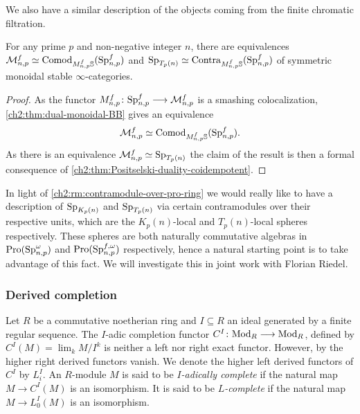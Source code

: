We also have a similar description of the objects coming from the finite chromatic filtration. 

\begin{proposition}
    For any prime $p$ and non-negative integer $n$, there are equivalences $\mathcal{M}_{n,p}^f \simeq \mathrm{Comod}_{M_{n,p}^f\mathbb{S}}(\mathrm{Sp}_{n,p}^f)$ and $\mathrm{Sp}_{T_p(n)}\simeq \mathrm{Contra}_{M_{n,p}^f\mathbb{S}}(\mathrm{Sp}_{n,p}^f)$ of symmetric monoidal stable $\infty$-categories. 
\end{proposition}
\begin{proof}
    As the functor $M_{n,p}^f\colon \mathrm{Sp}_{n,p}^f \longrightarrow \mathcal{M}_{n,p}^f$ is a smashing colocalization, \cref{ch2:thm:dual-monoidal-BB} gives an equivalence 
    \[\mathcal{M}_{n,p}^f \simeq \mathrm{Comod}_{M_{n,p}^f \mathbb{S}}(\mathrm{Sp}_{n,p}^f).\]
    As there is an equivalence $\mathcal{M}_{n,p}^f \simeq \mathrm{Sp}_{T_p(n)}$ the claim of the result is then a formal consequence of \cref{ch2:thm:Positselski-duality-coidempotent}.
\end{proof}

\begin{remark}
    In light of \cref{ch2:rm:contramodule-over-pro-ring} we would really like to have a description of $\mathrm{Sp}_{{K_p(n)}}$ and $\mathrm{Sp}_{T_p(n)}$ via certain contramodules over their respective units, which are the $K_p(n)$-local and $T_p(n)$-local spheres respectively. These spheres are both naturally commutative algebras in $\operatorname{Pro}(\mathrm{Sp}_{n,p}^\omega)$ and $\operatorname{Pro}(\mathrm{Sp}_{n,p}^{f, \omega})$ respectively, hence a natural starting point is to take advantage of this fact. We will investigate this in joint work with Florian Riedel. 
\end{remark}

\subsubsection*{Derived completion}
\label{ch2:ssec:derived-completion}

Let $R$ be a commutative noetherian ring and $I\subseteq R$ an ideal generated by a finite regular sequence. The $I$-adic completion functor $C^I\colon \mathrm{Mod}_R \longrightarrow \mathrm{Mod}_R$, defined by $C^I(M)=\lim_k M/I^k$ is neither a left nor right exact functor. However, by \cite[5.1]{greenlees-may_92} the higher right derived functors vanish. We denote the higher left derived functors of $C^I$ by $L^I_i$. An $R$-module $M$ is said to be \emph{$I$-adically complete} if the natural map $M\to C^I (M)$ is an isomorphism. It is said to be \emph{$L$-complete} if the natural map $M\to L_0^I(M)$ is an isomorphism. 

